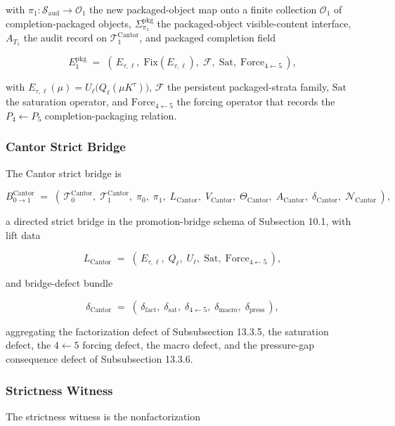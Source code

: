 \documentclass[11pt]{article}
\theoremstyle{definition}
\begin{document}
with \(\pi_1:\mathcal S_{\mathrm{aud}}\to\mathcal O_1\) the new packaged-object map onto a finite collection \(\mathcal O_1\) of completion-packaged objects, \(\Sigma_{\pi_1}^{\mathrm{pkg}}\) the packaged-object visible-content interface, \(A_{T_1}\) the audit record on \(\mathcal T_1^{\mathrm{Cantor}}\), and packaged completion field

\[
E_1^{\mathrm{pkg}}\;=\;(\,E_{\tau,\ell},\;\mathrm{Fix}(E_{\tau,\ell}),\;\mathcal F,\;\mathrm{Sat},\;\mathrm{Force}_{4\leftarrow 5}\,),
\]

with \(E_{\tau,\ell}(\mu)=U_{\ell}\bigl(Q_{\ell}(\mu K^{\tau})\bigr)\), \(\mathcal F\) the persistent packaged-strata family, \(\mathrm{Sat}\) the saturation operator, and \(\mathrm{Force}_{4\leftarrow 5}\) the forcing operator that records the \(P_4\leftarrow P_5\) completion-packaging relation.

\subsubsection{Cantor Strict Bridge}

The Cantor strict bridge is

\[
B_{0\to 1}^{\mathrm{Cantor}}\;=\;(\,\mathcal T_0^{\mathrm{Cantor}},\;\mathcal T_1^{\mathrm{Cantor}},\;\pi_0,\;\pi_1,\;L_{\mathrm{Cantor}},\;V_{\mathrm{Cantor}},\;\Theta_{\mathrm{Cantor}},\;A_{\mathrm{Cantor}},\;\delta_{\mathrm{Cantor}},\;\mathcal N_{\mathrm{Cantor}}\,),
\]

a directed strict bridge in the promotion-bridge schema of Subsection 10.1, with lift data

\[
L_{\mathrm{Cantor}}\;=\;(\,E_{\tau,\ell},\;Q_{\ell},\;U_{\ell},\;\mathrm{Sat},\;\mathrm{Force}_{4\leftarrow 5}\,),
\]

and bridge-defect bundle

\[
\delta_{\mathrm{Cantor}}\;=\;(\,\delta_{\mathrm{fact}},\;\delta_{\mathrm{sat}},\;\delta_{4\leftarrow 5},\;\delta_{\mathrm{macro}},\;\delta_{\mathrm{press}}\,),
\]

aggregating the factorization defect of Subsubsection 13.3.5, the saturation defect, the \(4\leftarrow 5\) forcing defect, the macro defect, and the pressure-gap consequence defect of Subsubsection 13.3.6.

\subsubsection{Strictness Witness}

The strictness witness is the nonfactorization
\end{document}
